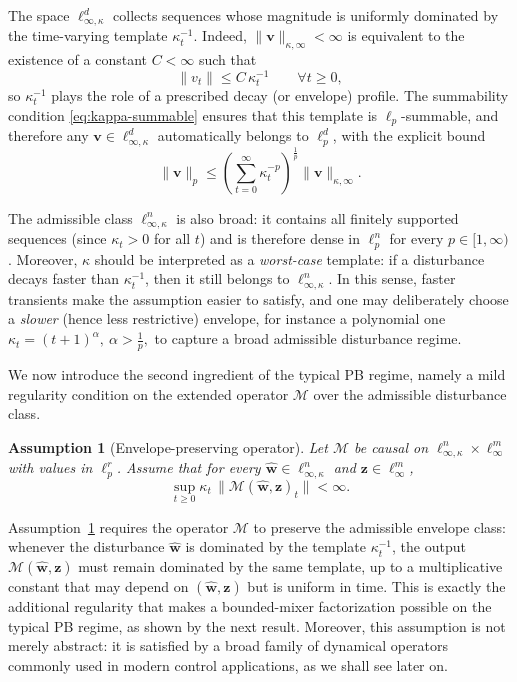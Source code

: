 \documentclass[journal,twoside,web]{ieeecolor}
\newtheorem{assumption}{Assumption}
\newcommand{\disturbance}{\mathbf{\widehat w}}
\newcommand{\operator}{\mathcal{M}}
\begin{document}
The space \(\ell_{\infty,\kappa}^d\) collects sequences whose magnitude is uniformly dominated by the
time-varying template \(\kappa_t^{-1}\). Indeed, \(\|\mathbf v\|_{\kappa,\infty}<\infty\) is equivalent to
the existence of a constant \(C<\infty\) such that
\[
\|v_t\|\le C\,\kappa_t^{-1}\qquad \forall t\ge 0,
\]
so \(\kappa_t^{-1}\) plays the role of a prescribed decay (or envelope) profile.
The summability condition \eqref{eq:kappa-summable} ensures that this template is \(\ell_p\)-summable,
and therefore any \(\mathbf v\in\ell_{\infty,\kappa}^d\) automatically belongs to \(\ell_p^d\), with the
explicit bound
\begin{equation}\label{eq:kappa-embed-inline}
\|\mathbf v\|_p
\le
\left(\sum_{t=0}^\infty \kappa_t^{-p}\right)^{\!\frac1p}
\|\mathbf v\|_{\kappa,\infty}.
\end{equation}

The admissible class \(\ell_{\infty,\kappa}^n\) is also broad: it contains all finitely supported
sequences (since \(\kappa_t>0\) for all \(t\)) and is therefore dense in \(\ell_p^n\) for every
\(p\in[1,\infty)\). Moreover, \(\kappa\) should be interpreted as a \emph{worst-case} template:
if a disturbance decays faster than \(\kappa_t^{-1}\), then it still belongs to
\(\ell_{\infty,\kappa}^n\). In this sense, faster transients make the assumption easier to satisfy,
and one may deliberately choose a \emph{slower} (hence less restrictive) envelope, for instance a
polynomial one
$\kappa_t=(t+1)^\alpha,\: \alpha>\frac{1}{p},$
to capture a broad admissible disturbance regime.

\smallskip

We now introduce the second ingredient of the typical PB regime, namely a mild regularity condition on
the extended operator \(\operator\) over the admissible disturbance class.

\begin{assumption}[Envelope-preserving operator]\label{ass:env}
Let \(\operator\) be causal on \(\ell_{\infty,\kappa}^n\times \ell_\infty^m\) with values in \(\ell_p^r\).
Assume that for every \(\disturbance\in\ell_{\infty,\kappa}^n\) and
\(\mathbf z\in\ell_\infty^m\),
\begin{equation}\label{eq:env}
\sup_{t\ge 0}\kappa_t\,\|\operator(\disturbance,\mathbf z)_t\| < \infty.
\end{equation}
\end{assumption}

Assumption~\ref{ass:env} requires the operator \(\operator\) to preserve the admissible envelope class:
whenever the disturbance \(\disturbance\) is dominated by the template \(\kappa_t^{-1}\), the output
\(\operator(\disturbance,\mathbf z)\) must remain dominated by the same template, up to a multiplicative
constant that may depend on \((\disturbance,\mathbf z)\) but is uniform in time. This is exactly the
additional regularity that makes a bounded-mixer factorization possible on the typical PB regime, as
shown by the next result. Moreover, this assumption is not merely abstract: it is satisfied by a broad
family of dynamical operators commonly used in modern control applications, as we shall see later on.
\end{document}
